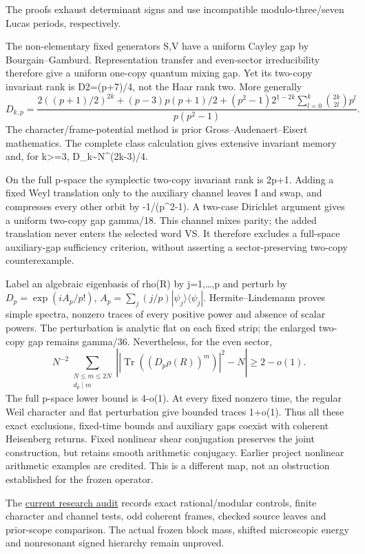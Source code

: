 The proofs
exhaust determinant signs and use incompatible modulo-three/seven Lucas
periods, respectively.

The non-elementary fixed generators S,V have a uniform Cayley gap by
Bourgain--Gamburd. Representation transfer and even-sector irreducibility
therefore give a uniform one-copy quantum mixing gap. Yet its two-copy
invariant rank is D2=(p+7)/4, not the Haar rank two. More generally
\[
D_{k,p}=\frac{2((p+1)/2)^{2k}+(p-3)p(p+1)/2
 +(p^2-1)2^{1-2k}\sum_{l=0}^k\binom{2k}{2l}p^l}{p(p^2-1)}.
\]
The character/frame-potential method is prior Gross--Audenaert--Eisert
mathematics. The complete class calculation gives extensive invariant
memory and, for k\textgreater=3, D\_k\textasciitilde N\^{}(2k-3)/4.

On the full p-space the symplectic two-copy invariant rank is 2p+1.
Adding a fixed Weyl translation only to the auxiliary channel leaves I
and swap, and compresses every other orbit by -1/(p\^{}2-1). A two-case
Dirichlet argument gives a uniform two-copy gap gamma/18. This channel
mixes parity; the added translation never enters the selected word VS.
It therefore excludes a full-space auxiliary-gap sufficiency criterion,
without asserting a sector-preserving two-copy counterexample.

Label an algebraic eigenbasis of rho(R) by j=1,\ldots,p and perturb by
\(D_p=\exp(iA_p/p!)\), \(A_p=\sum_j(j/p)|\psi_j\rangle\langle\psi_j|\).
Hermite--Lindemann proves simple spectra, nonzero traces of every positive
power and absence of scalar powers. The perturbation is analytic flat
on each fixed strip; the enlarged two-copy gap remains gamma/36.
Nevertheless, for the even sector,
\[
N^{-2}\sum_{\substack{N\le m\le2N\\d_p\mid m}}
 \left||\operatorname{Tr}((D_p\rho(R))^m)|^2-N\right|\ge2-o(1).
\]
The full p-space lower bound is 4-o(1). At every fixed nonzero time,
the regular Weil character and flat perturbation give bounded traces
1+o(1). Thus all these exact exclusions, fixed-time bounds and auxiliary
gaps coexist with coherent Heisenberg returns. Fixed nonlinear shear
conjugation preserves the joint construction, but retains smooth
arithmetic conjugacy. Earlier project nonlinear arithmetic examples
are credited. This is a different map, not an obstruction established
for the frozen operator.

The \href{https://github.com/ChurilovMaksim/BGS/blob/main/archive/record/expansion_wavepacket_review_20261004.md}{current research audit}
records exact rational/modular controls, finite character and channel tests,
odd coherent frames, checked source leaves and prior-scope comparison.
The actual frozen block mass, shifted microscopic energy and nonresonant
signed hierarchy remain unproved.

